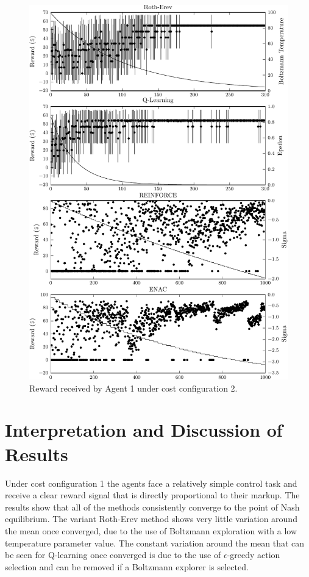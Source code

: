 {\begin{figure}
	  \includegraphics{figures/fig5_2_reward_a1}
	  \caption{Reward received by Agent 1 under cost configuration 2.}
	  \label{fig:5_2_reward_a1}
	\end{figure}
}{}

\section{Interpretation and Discussion of Results}
Under cost configuration 1 the agents face a relatively simple control task and
receive a clear reward signal that is directly proportional to their markup. The
results show that all of the methods consistently converge to the point of Nash
equilibrium.  The variant Roth-Erev method shows very little variation around
the mean once converged, due to the use of Boltzmann exploration with a low
temperature parameter value.  The constant variation around the mean that can be
seen for Q-learning once converged is due to the use of $\epsilon$-greedy action
selection and can be removed if a Boltzmann explorer is selected.

